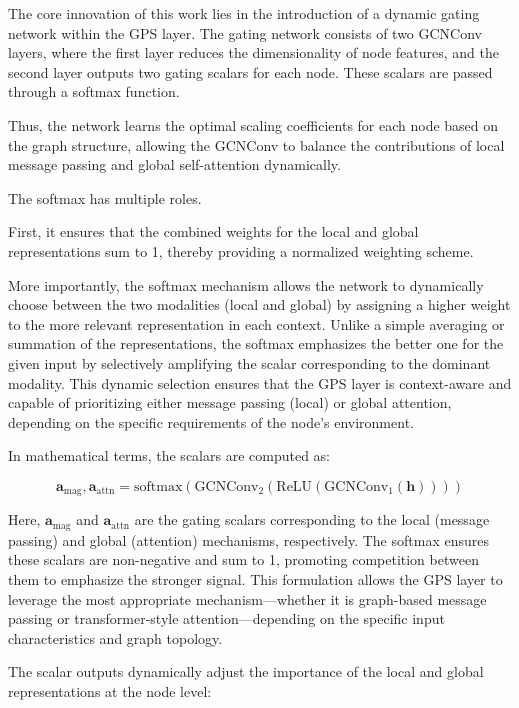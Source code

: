 \documentclass{acmart}
\begin{document}
The core innovation of this work lies in the introduction of a dynamic gating network within the GPS layer. The gating network consists of two GCNConv layers, where the first layer reduces the dimensionality of node features, and the second layer outputs two gating scalars for each node. These scalars are passed through a softmax function.

Thus, the network learns the optimal scaling coefficients for each node based on the graph structure, allowing the GCNConv to balance the contributions of local message passing and global self-attention dynamically.

The softmax has multiple roles. 

First, it ensures that the combined weights for the local and global representations sum to 1, thereby providing a normalized weighting scheme. 

More importantly, the softmax mechanism allows the network to dynamically choose between the two modalities (local and global) by assigning a higher weight to the more relevant representation in each context. Unlike a simple averaging or summation of the representations, the softmax emphasizes the better one for the given input by selectively amplifying the scalar corresponding to the dominant modality. This dynamic selection ensures that the GPS layer is context-aware and capable of prioritizing either message passing (local) or global attention, depending on the specific requirements of the node’s environment.

In mathematical terms, the scalars are computed as:

\begin{equation}
\mathbf{a}_{\text{mag}}, \mathbf{a}_{\text{attn}} = \text{softmax}\left(\text{GCNConv}_2\left(\text{ReLU}\left(\text{GCNConv}_1(\mathbf{h})\right)\right)\right)
\end{equation}


Here, \( \mathbf{a}_{\text{mag}} \) and \( \mathbf{a}_{\text{attn}} \) are the gating scalars corresponding to the local (message passing) and global (attention) mechanisms, respectively. The softmax ensures these scalars are non-negative and sum to 1, promoting competition between them to emphasize the stronger signal. This formulation allows the GPS layer to leverage the most appropriate mechanism—whether it is graph-based message passing or transformer-style attention—depending on the specific input characteristics and graph topology.

The scalar outputs dynamically adjust the importance of the local and global representations at the node level:
\end{document}
